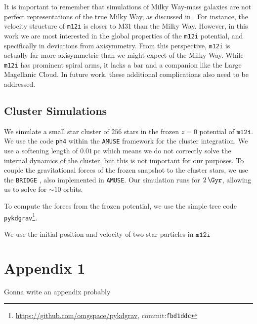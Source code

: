 \documentclass[twocolumn]{aastex62}
\newcommand{\pc}{\text{pc}}
\newcommand{\z}{z}
\begin{document}
It is important to remember that simulations of Milky Way-mass galaxies are
not perfect representations of the true Milky Way, as discussed in
\citet{2018arXiv180610564S}. For instance, the velocity structure of
\texttt{m12i} is closer to M31 than the Milky Way. However, in this work we
are most interested in the global properties of the \texttt{m12i} potential,
and specifically in deviations from axisymmetry. From this perspective,
\texttt{m12i} is actually far more axisymmetric than we might expect of the
Milky Way. While \texttt{m12i} has prominent spiral arms, it lacks a bar and
a companion like the Large Magellanic Cloud. In future work, these additional
complications also need to be addressed.

\subsection{Cluster Simulations} \label{ssec:cluster_sim}
We simulate a small star cluster of $256$ stars in the frozen $\z=0$
potential of $\texttt{m12i}$. We use the code \texttt{ph4} within the
\texttt{AMUSE} framework \citep{2011ascl.soft07007P, 2013CoPhC.184..456P,
2013A&A...557A..84P} for the cluster integration. We use a softening length
of $0.01\,\pc$ which means we do not correctly solve the internal dynamics of
the cluster, but this is not important for our purposes. To couple the
gravitational forces of the frozen snapshot to the cluster stars, we use the
\texttt{BRIDGE} \citep{2007PASJ...59.1095F}, also implemented in
\texttt{AMUSE}. Our simulation runs for $2\,\Gyr$, allowing us to solve for
$\sim 10$ orbits.

To compute the forces from the frozen potential, we use the simple tree code
\texttt{pykdgrav}\footnote{\url{https://github.com/omgspace/pykdgrav},
commit:\texttt{fbd1ddc}}. 

We use the initial position and velocity of two star particles in
$\texttt{m12i}$

\appendix \section{Appendix 1}
Gonna write an appendix probably 


\end{document}
